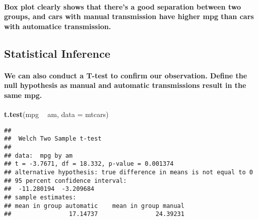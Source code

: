 \documentclass[]{article}
\newenvironment{Shaded}{\begin{snugshade}}{\end{snugshade}}
\newcommand{\DataTypeTok}[1]{\textcolor[rgb]{0.13,0.29,0.53}{#1}}
\newcommand{\KeywordTok}[1]{\textcolor[rgb]{0.13,0.29,0.53}{\textbf{#1}}}
\newcommand{\NormalTok}[1]{#1}
\newcommand{\OperatorTok}[1]{\textcolor[rgb]{0.81,0.36,0.00}{\textbf{#1}}}
\newcommand{\StringTok}[1]{\textcolor[rgb]{0.31,0.60,0.02}{#1}}
\let\oldparagraph\paragraph
\renewcommand{\paragraph}[1]{\oldparagraph{#1}\mbox{}}
\begin{document}
\hypertarget{box-plot-clearly-shows-that-theres-a-good-separation-between-two-groups-and-cars-with-manual-transmission-have-higher-mpg-than-cars-with-automatice-transmission.}{%
\paragraph{Box plot clearly shows that there's a good separation between
two groups, and cars with manual transmission have higher mpg than cars
with automatice
transmission.}\label{box-plot-clearly-shows-that-theres-a-good-separation-between-two-groups-and-cars-with-manual-transmission-have-higher-mpg-than-cars-with-automatice-transmission.}}

\hypertarget{statistical-inference}{%
\subsection{Statistical Inference}\label{statistical-inference}}

\hypertarget{we-can-also-conduct-a-t-test-to-confirm-our-observation.-define-the-null-hypothesis-as-manual-and-automatic-transmissions-result-in-the-same-mpg.}{%
\paragraph{We can also conduct a T-test to confirm our observation.
Define the null hypothesis as manual and automatic transmissions result
in the same
mpg.}\label{we-can-also-conduct-a-t-test-to-confirm-our-observation.-define-the-null-hypothesis-as-manual-and-automatic-transmissions-result-in-the-same-mpg.}}

\begin{Shaded}
\begin{Highlighting}[]
\KeywordTok{t.test}\NormalTok{(mpg }\OperatorTok{~}\StringTok{ }\NormalTok{am, }\DataTypeTok{data =}\NormalTok{ mtcars)}
\end{Highlighting}
\end{Shaded}

\begin{verbatim}
## 
##  Welch Two Sample t-test
## 
## data:  mpg by am
## t = -3.7671, df = 18.332, p-value = 0.001374
## alternative hypothesis: true difference in means is not equal to 0
## 95 percent confidence interval:
##  -11.280194  -3.209684
## sample estimates:
## mean in group automatic    mean in group manual 
##                17.14737                24.39231
\end{verbatim}
\end{document}
